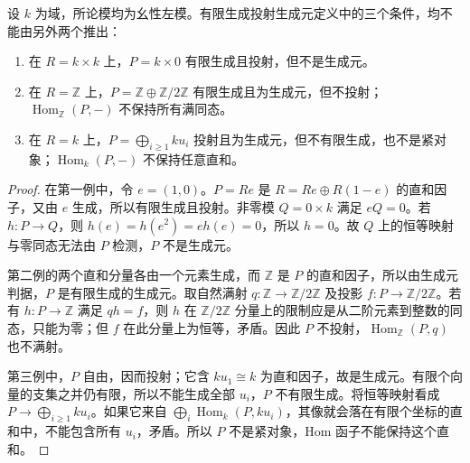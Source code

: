 \begin{proposition}\label{b2:prop:progenerator-hypothesis-counterexamples}
	设 \(k\) 为域，所论模均为幺性左模。有限生成投射生成元定义中的三个条件，均不能由另外两个推出：
	\begin{enumerate}
		\item 在 \(R=k\times k\) 上，\(P=k\times0\) 有限生成且投射，但不是生成元。
		\item 在 \(R=\mathbb Z\) 上，\(P=\mathbb Z\oplus\mathbb Z/2\mathbb Z\) 有限生成且为生成元，但不投射；\(\operatorname{Hom}_{\mathbb Z}(P,-)\) 不保持所有满同态。
		\item 在 \(R=k\) 上，\(P=\bigoplus_{i\ge1}ku_i\) 投射且为生成元，但不有限生成，也不是紧对象；\(\operatorname{Hom}_k(P,-)\) 不保持任意直和。
	\end{enumerate}
\end{proposition}
\begin{proof}
	在第一例中，令 \(e=(1,0)\)。\(P=Re\) 是 \(R=Re\oplus R(1-e)\) 的直和因子，又由 \(e\) 生成，所以有限生成且投射。非零模 \(Q=0\times k\) 满足 \(eQ=0\)。若 \(h:P\to Q\)，则 \(h(e)=h(e^2)=eh(e)=0\)，所以 \(h=0\)。故 \(Q\) 上的恒等映射与零同态无法由 \(P\) 检测，\(P\) 不是生成元。

	第二例的两个直和分量各由一个元素生成，而 \(\mathbb Z\) 是 \(P\) 的直和因子，所以由生成元判据，\(P\) 是有限生成的生成元。取自然满射 \(q:\mathbb Z\to\mathbb Z/2\mathbb Z\) 及投影 \(f:P\to\mathbb Z/2\mathbb Z\)。若有 \(h:P\to\mathbb Z\) 满足 \(qh=f\)，则 \(h\) 在 \(\mathbb Z/2\mathbb Z\) 分量上的限制应是从二阶元素到整数的同态，只能为零；但 \(f\) 在此分量上为恒等，矛盾。因此 \(P\) 不投射，\(\operatorname{Hom}_{\mathbb Z}(P,q)\) 也不满射。

	第三例中，\(P\) 自由，因而投射；它含 \(ku_1\cong k\) 为直和因子，故是生成元。有限个向量的支集之并仍有限，所以不能生成全部 \(u_i\)，\(P\) 不有限生成。将恒等映射看成 \(P\to\bigoplus_{i\ge1}ku_i\)。如果它来自 \(\bigoplus_i\operatorname{Hom}_k(P,ku_i)\)，其像就会落在有限个坐标的直和中，不能包含所有 \(u_i\)，矛盾。所以 \(P\) 不是紧对象，Hom 函子不能保持这个直和。
\end{proof}
